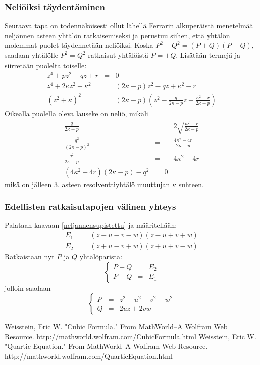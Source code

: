 \documentclass[a4paper]{article}
\begin{document}
\subsubsection{Neliöiksi täydentäminen}
Seuraava tapa on todennäköisesti ollut lähellä Ferrarin alkuperäistä menetelmää neljännen asteen yhtälön ratkaisemiseksi ja perustuu siihen, että yhtälön molemmat puolet täydennetään neliöiksi. Koska $P^2-Q^2=(P+Q)(P-Q)$, saadaan yhtälölle $P^2=Q^2$ ratkaisut yhtälöistä $P=\pm Q$. Lisätään termejä ja siirretään puolelta toiselle:
\begin{eqnarray*}
  z^4+pz^2+qz+r & = & 0 \\
  z^4+2\kappa z^2+\kappa^2 & = & (2\kappa-p) z^2-qz+\kappa^2-r \\
  \left(z^2+\kappa\right)^2 & = & \left(2\kappa-p\right)\left(z^2-\frac{q}{2\kappa -p}z+\frac{\kappa^2-r}{2\kappa -p}\right)
\end{eqnarray*}
Oikealla puolella oleva lauseke on neliö, mikäli
\begin{eqnarray*}
  \frac{q}{2\kappa -p} & = & 2\sqrt{\frac{\kappa^2-r}{2\kappa -p}} \\
  \frac{q^2}{(2\kappa -p)^2} & = & \frac{4\kappa^2-4r}{2\kappa -p} \\
  \frac{q^2}{2\kappa -p} & = & 4\kappa^2-4r \\
  (4\kappa^2-4r)(2\kappa -p)-q^2 & = 0
\end{eqnarray*}
mikä on jälleen 3. asteen resolventtiyhtälö muuttujan $\kappa$ suhteen.
\subsubsection{Edellisten ratkaisutapojen välinen yhteys}
Palataan kaavaan \ref{neljannensupistettu} ja määritellään:
\begin{eqnarray*}
  E_1 & = & (z-u-v-w)(z-u+v+w) \\
  E_2 & = & (z+u-v+w)(z+u+v-w)
\end{eqnarray*}
Ratkaistaan nyt $P$ ja $Q$ yhtälöparista:
$$
  \left\{
  \begin{array}{ccc}
    P+Q & = & E_2 \\
    P-Q & = & E_1
  \end{array}
  \right.
$$
jolloin saadaan
$$
  \left\{
  \begin{array}{ccc}
    P & = & z^2+u^2-v^2-w^2 \\
    Q & = & 2uz+2vw
  \end{array}
  \right.
$$
\begin{thebibliography}{99}
 Weisstein, Eric W. "Cubic Formula." From MathWorld--A Wolfram Web Resource. http://mathworld.wolfram.com/CubicFormula.html
 Weisstein, Eric W. "Quartic Equation." From MathWorld--A Wolfram Web Resource. http://mathworld.wolfram.com/QuarticEquation.html
\end{thebibliography}
\end{document}
